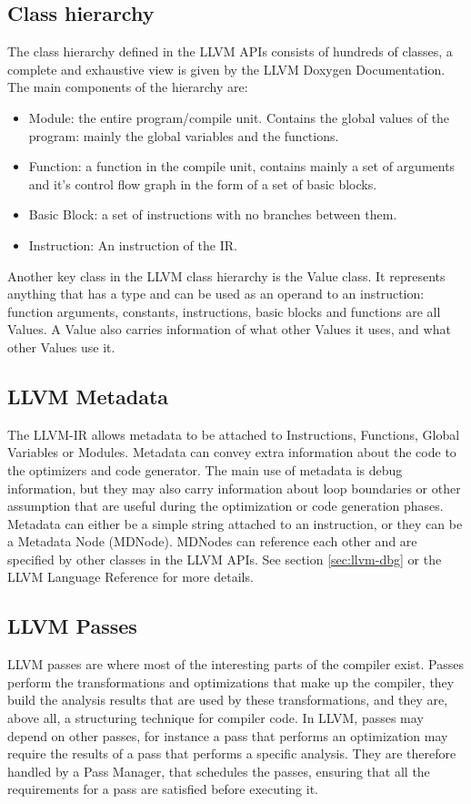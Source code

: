 \subsection{Class hierarchy}
The class hierarchy defined in the LLVM APIs consists of hundreds of classes, a complete and exhaustive view is given by the LLVM Doxygen Documentation. The main components of the hierarchy are:
\begin{itemize}
\item Module: the entire program/compile unit. Contains the global values of the program: mainly the global variables and the functions.
\item Function: a function in the compile unit, contains mainly a set of arguments and it's control flow graph in the form of a set of basic blocks.
\item Basic Block: a set of instructions with no branches between them.
\item Instruction: An instruction of the IR.
\end{itemize}
Another key class in the LLVM class hierarchy is the Value class. It represents anything that has a type and can be used as an operand to an instruction: function arguments, constants, instructions, basic blocks and functions are all Values.
A Value also carries information of what other Values it uses, and what other Values use it.

\subsection{LLVM Metadata}
The LLVM-IR allows metadata to be attached to Instructions, Functions, Global Variables or  Modules. Metadata can convey extra information about the code to the optimizers and code generator.
The main use of metadata is debug information, but they may also carry information about loop boundaries or other assumption that are useful during the optimization or code generation phases. \newline
Metadata can either be a simple string attached to an instruction, or they can be a Metadata Node (MDNode). MDNodes can reference each other and are specified by other classes in the LLVM APIs. See section \ref{sec:llvm-dbg} or the LLVM Language Reference \cite{llvm-langref} for more details.

\subsection{LLVM Passes}
LLVM passes are where most of the interesting parts of the compiler exist. Passes perform the transformations and optimizations that make up the compiler, they build the analysis results that are used by these transformations, and they are, above all, a structuring technique for compiler code.
In LLVM, passes may depend on other passes, for instance a pass that performs an optimization may require the results of a pass that performs a specific analysis.
They are therefore handled by a Pass Manager, that schedules the passes, ensuring that all the requirements for a pass are satisfied before executing it.

